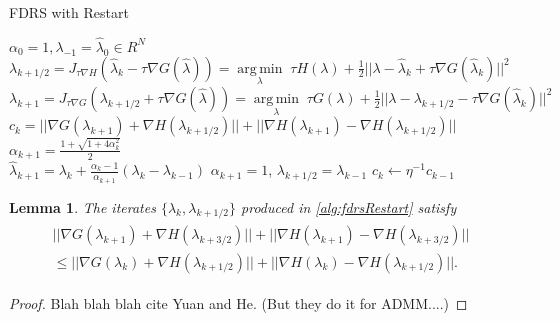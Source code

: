 \documentclass[11pt]{article}
\newcommand{\inv}{^{-1}}
\newcommand{\argmin}[1]{\underset{#1}{\operatorname{arg\,min}}\;}
\def\grad {{\nabla}}
\newtheorem{lemma}{Lemma}
\begin{document}
\begin{algorithm}
\caption{FDRS with Restart}
\label{alg:fdrsRestart}
\begin{algorithmic}[1]
\REQUIRE $\alpha_0 = 1, \lambda_{-1} = \hat\lambda_0 \in R^N$
\STATE $\lambda_{k+1/2} = J_{\tau \grad H}(\hat\lambda_k - \tau \grad G(\hat\lambda)) = \argmin{\lambda} \tau H(\lambda) + \frac 12||\lambda - \hat\lambda_k + \tau \grad G(\hat\lambda_k)||^2$
\STATE $\lambda_{k+1} = J_{\tau \grad G}(\lambda_{k+1/2} + \tau \grad G(\hat\lambda)) = \argmin{\lambda} \tau G(\lambda) + \frac 12||\lambda - \lambda_{k+1/2} - \tau \grad G(\hat\lambda_k)||^2$
  \STATE $c_k = ||\grad G(\lambda_{k+1}) + \grad H(\lambda_{k+1/2})|| + ||\grad H(\lambda_{k+1}) - \grad H(\lambda_{k+1/2})||$
  \STATE $\alpha_{k+1} = \frac {1+\sqrt{1+4\alpha_k^2}}2$ \\
  \STATE $\hat\lambda_{k+1} = \lambda_k + \frac {\alpha_k - 1}{\alpha_{k+1}}(\lambda_k - \lambda_{k-1})$
  \ELSE
  \STATE $\alpha_{k+1} = 1$, $\lambda_{k+1/2} = \lambda_{k-1}$
  \STATE $c_k \leftarrow \eta\inv c_{k-1}$
  \ENDIF
\ENDFOR
\end{algorithmic}
\end{algorithm}

\begin{lemma}
\label{lem:4}
The iterates $\{\lambda_k, \lambda_{k+1/2}\}$ produced in \cref{alg:fdrsRestart} satisfy
\begin{align}
\begin{split}
|| \grad G(\lambda_{k+1}) + \grad H(\lambda_{k+3/2}) || + || \grad H(\lambda_{k+1}) - \grad H(\lambda_{k+3/2}) || \\
\le || \grad G(\lambda_k) + \grad H(\lambda_{k+1/2}) || + || \grad H(\lambda_k) - \grad H(\lambda_{k+1/2}) ||.
\end{split}
\end{align}
\end{lemma}

\begin{proof}
Blah blah blah cite Yuan and He.  (But they do it for ADMM....)
\end{proof}
\end{document}
